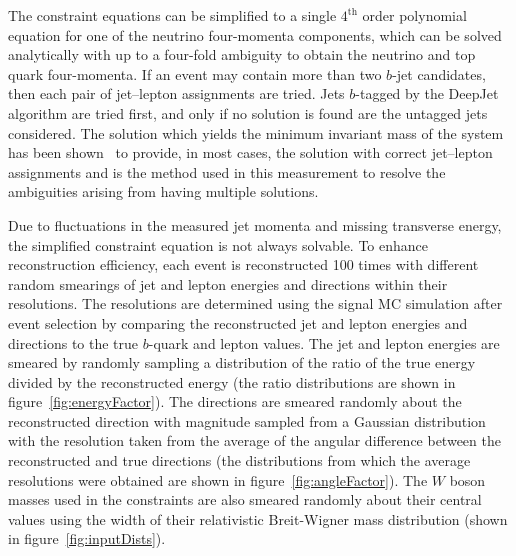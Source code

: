 The constraint equations can be simplified to a single $4^{\text{th}}$ order polynomial equation for one of the neutrino four-momenta components, which can be solved analytically with up to a four-fold ambiguity to obtain the neutrino and top quark four-momenta.
If an event may contain more than two $b$-jet candidates, then each pair of jet--lepton assignments are tried.
Jets $b$-tagged by the DeepJet algorithm are tried first, and only if no solution is found are the untagged jets considered.
The solution which yields the minimum invariant mass of the \ttbar system has been shown~\cite{PhysRevD.73.112006} to provide, in most cases, the solution with correct jet--lepton assignments and is the method used in this measurement to resolve the ambiguities arising from having multiple solutions.

Due to fluctuations in the measured jet momenta and missing transverse energy, the simplified constraint equation is not always solvable.
To enhance reconstruction efficiency, each event is reconstructed 100 times with different random smearings of jet and lepton energies and directions within their resolutions.
The resolutions are determined using the signal MC simulation after event selection by comparing the reconstructed jet and lepton energies and directions to the true $b$-quark and lepton values.
The jet and lepton energies are smeared by randomly sampling a distribution of the ratio of the true energy divided by the reconstructed energy (the ratio distributions are shown in figure~\ref{fig:energyFactor}).
The directions are smeared randomly about the reconstructed direction with magnitude sampled from a Gaussian distribution with the resolution taken from the average of the angular difference between the reconstructed and true directions (the distributions from which the average resolutions were obtained are shown in figure~\ref{fig:angleFactor}).
The $W$ boson masses used in the constraints are also smeared randomly about their central values using the width of their relativistic Breit-Wigner mass distribution (shown in figure~\ref{fig:inputDists}).

